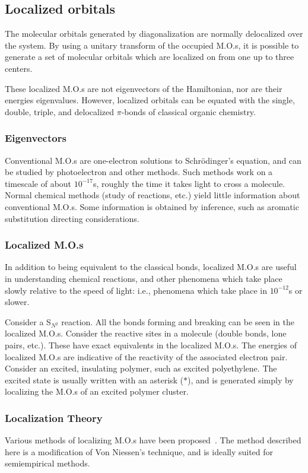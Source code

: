\subsection{Localized orbitals}\label{local}
The molecular orbitals generated by diagonalization are normally delocalized
over the system.  By using a unitary transform of the occupied M.O.s, it is
possible to generate a set of molecular orbitals which are localized on from
one up to three centers.

These localized M.O.s are not eigenvectors of the Hamiltonian, nor are their
energies eigenvalues.  However, localized orbitals can be equated with the
single, double, triple, and delocalized $\pi$-bonds of classical organic
chemistry.

\subsubsection{Eigenvectors}
Conventional M.O.s are one-electron solutions to Schr\"{o}dinger's equation,
and can be studied by photoelectron and other methods.  Such methods work on a
timescale of about $10^{-17}$s, roughly the time it takes light to cross a
molecule.  Normal chemical methods (study of reactions, etc.)  yield little
information about conventional M.O.s.  Some information is obtained by
inference, such as aromatic substitution directing considerations.

\subsubsection{Localized M.O.s}
In addition to being equivalent to the classical bonds, localized M.O.s are
useful in understanding chemical reactions, and other phenomena which take
place slowly relative to the speed of light: i.e., phenomena which take place
in $10^{-12}$s or slower.

Consider a S$_{N^2}$ reaction.  All the bonds forming and breaking can be seen
in the localized M.O.s.  Consider the reactive sites in a molecule (double bonds,
lone pairs, etc.).  These have exact equivalents in the localized M.O.s.  The
energies of localized M.O.s are indicative of the reactivity of the associated
electron pair.  Consider an excited, insulating polymer, such as excited
polyethylene.  The excited state is usually written with an asterisk ($*$), and
is generated simply by localizing the M.O.s of an excited polymer cluster.
\subsubsection{Localization Theory}
Various methods of localizing M.O.s have been 
proposed~\cite{boys,edmrue,von-niessen}.  The method 
described here is a modification of  Von Niessen's
technique, and is ideally suited for semiempirical methods.

